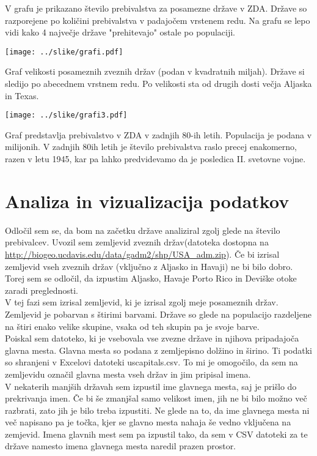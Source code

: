 \documentclass[11pt,a4paper]{article}
\begin{document}
V grafu je prikazano število prebivalstva za posamezne države v ZDA. Države so razporejene po količini prebivalstva v padajočem vrstenem redu. Na grafu se lepo vidi kako 4 največje države "prehitevajo" ostale po populaciji.

\texttt{[image: ../slike/grafi.pdf]}

Graf velikosti posameznih zveznih držav (podan v kvadratnih miljah). Države si sledijo po abecednem vrstnem redu. Po velikosti sta od drugih dosti večja Aljaska in Texas.

\texttt{[image: ../slike/grafi3.pdf]}

Graf predstavlja prebivalstvo v ZDA v zadnjih 80-ih letih. Populacija je podana v milijonih.
V zadnjih 80ih letih je število prebivalstva raslo precej enakomerno, razen v letu 1945, kar pa lahko predvidevamo da je posledica II. svetovne vojne.

\pagebreak

\section{Analiza in vizualizacija podatkov}

Odločil sem se, da bom na začetku države analiziral zgolj glede na število prebivalcev. Uvozil sem zemljevid zveznih držav(datoteka dostopna na \url{http://biogeo.ucdavis.edu/data/gadm2/shp/USA_adm.zip}). Če bi izrisal zemljevid vseh zveznih držav (vključno z Aljasko in Havaji) ne bi bilo dobro. Torej sem se odločil, da izpustim Aljasko, Havaje Porto Rico in Deviške otoke zaradi
preglednosti. \\
V tej fazi sem izrisal zemljevid, ki je izrisal zgolj meje posameznih držav.
Zemljevid je pobarvan s štirimi barvami. Države so glede na populacijo razdeljene na štiri enako velike skupine, vsaka od teh skupin pa je svoje barve.\\
Poiskal sem datoteko, ki je vsebovala vse zvezne države in njihova pripadajoča glavna mesta. Glavna mesta so podana z zemljepisno dolžino in širino. Ti podatki so shranjeni v Excelovi datoteki uscapitals.csv. To mi je omogočilo, da sem na zemljevidu označil glavna mesta vseh držav in jim pripisal imena. \\
V nekaterih manjših državah sem izpustil ime glavnega mesta, saj je prišlo do prekrivanja imen. Če bi še zmanjšal samo velikost imen, jih ne bi bilo možno več razbrati, zato jih je bilo treba izpustiti. Ne glede na to, da ime glavnega mesta ni več napisano pa je točka, kjer se glavno mesta nahaja še vedno vključena na zemjevid. Imena glavnih mest sem pa izpustil tako, da sem v CSV datoteki za te države namesto imena glavnega mesta naredil prazen prostor.
\end{document}
